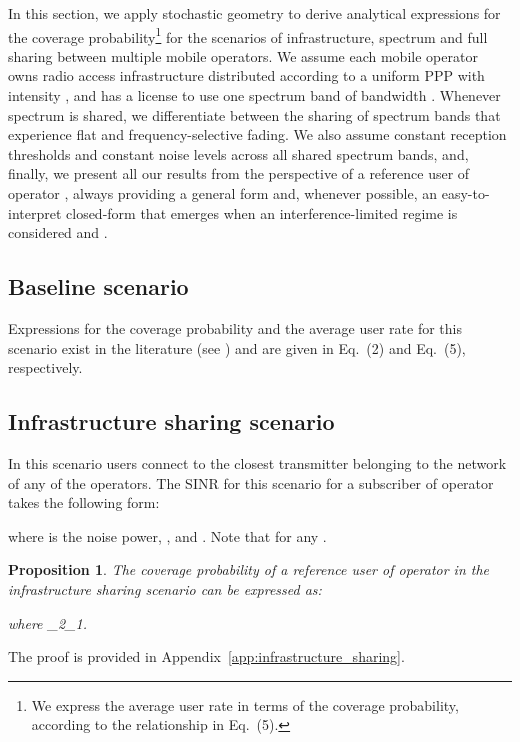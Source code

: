 \documentclass[12pt, journal,doublecolumn, final]{IEEEtran}
\newcommand{\App}[1]{Appendix~\ref{app:#1}}
\newtheorem{proposition}{Proposition}
\begin{document}
In this section, we apply stochastic geometry to derive analytical expressions for the coverage probability\footnote{We express the average user rate in terms of the coverage probability, according to the relationship in Eq.~(5).} for the scenarios of infrastructure, spectrum and full sharing between multiple mobile operators. We assume each mobile operator owns radio access infrastructure distributed according to a uniform \ac{PPP} with intensity , and has a license to use one spectrum band of bandwidth . Whenever spectrum is shared, we differentiate between the sharing of spectrum bands that experience flat and frequency-selective fading. We also assume constant reception thresholds and constant noise levels across all shared spectrum bands, and, finally, we present all our results from the perspective of a reference user of operator , always providing a general form and, whenever possible, an easy-to-interpret closed-form that emerges when an interference-limited regime is considered and .

\subsection{Baseline scenario}

Expressions for the coverage probability and the average user rate for this scenario exist in the literature (see \cite{AndrewsBaccelliGanti_2011}) and are given in Eq.~(2) and Eq.~(5), respectively.

\subsection{Infrastructure sharing scenario}

In this scenario users connect to the closest transmitter belonging to the network of any of the  operators. The \ac{SINR} for this scenario for a subscriber of operator  takes the following form:

where  is the noise power, , and . Note that  for any .

\begin{proposition}
The coverage probability of a reference user of operator  in the infrastructure sharing scenario can be expressed as:

where _2_1.

\label{prop:roaming}
\end{proposition}
\begin{IEEEproof}

The proof is provided in \App{infrastructure_sharing}.

\end{IEEEproof}
\end{document}
